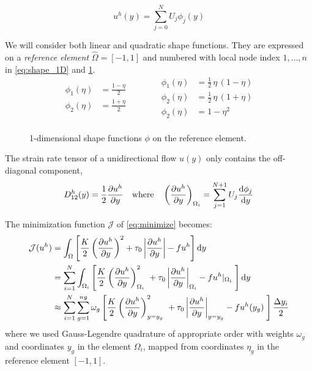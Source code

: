 \documentclass[11 pt]{report}
\begin{document}
\begin{equation}
        u^h(y) = \sum_{j=0}^N U_j \phi_j(y)
\end{equation}

We will consider both linear and quadratic shape functions. They are expressed on a \textit{reference element} $\hat \Omega = [-1, 1]$ and numbered with local node index $1,\dots,n$ in \cref{eq:shape_1D} and \cref{fig:shape_fct_1D}.
\begin{equation}
    \begin{split}
        \phi_1(\eta) &= \frac{1-\eta}{2}\\
        \phi_2(\eta) &= \frac{1+\eta}{2}\\
    \end{split}
    \hspace{40pt}
    \begin{split}
        \phi_1(\eta) &= \frac{1}{2} \, \eta \, (1-\eta)\\
        \phi_2(\eta) &= \frac{1}{2} \, \eta \, (1+\eta)\\
        \phi_2(\eta) &= 1 - \eta^2\\
    \end{split}
    \label{eq:shape_1D}
\end{equation}

\begin{figure}[ht]
    \centering
    
    \caption{1-dimensional shape functions $\phi$ on the reference element.}
    \label{fig:shape_fct_1D}
\end{figure}


The strain rate tensor of a unidirectional flow $u(y)$ only contains the off-diagonal component,
\begin{equation}
    D_{12}^h(y) = \frac{1}{2} \pdv{u^h}{y} \quad \text{where} \quad \left(\pdv{u^h}{y}\right)_{\Omega_i} = \sum_{j=1}^{N+1} U_j \dv{\phi_j}{y}
\end{equation}

The minimization function $\mathcal{J}$ of \cref{eq:minimize} becomes:
\begin{equation}
\begin{aligned}
    \mathcal{J}(u^h) &= \int_{\Omega} \left[ \frac{K}{2} \left(\pdv{u^h}{y}\right)^2 + \tau_0 \left|\pdv{u^h}{y}\right| - f u^h \right] \dd y\\
    &= \sum_{i=1}^N \int_{\Omega_i} \left[\frac{K}{2}  \left(\pdv{u^h}{y}\right)^2_{\Omega_i} \ + \tau_0 \left|\pdv{u^h}{y}\right|_{\Omega_i} - f u^h\vert_{\Omega_i} \; \right] \dd y\\
    &\approx \sum_{i=1}^N \sum_{g=1}^{ng} \omega_{g} \left[\frac{K}{2}  \left(\pdv{u^h}{y}\right)^2_{y=y_g} \ + \tau_0 \left|\pdv{u^h}{y}\right|_{y=y_g} - f u^h(y_g) \; \right] \frac{\Delta y_i}{2}
\end{aligned}
\end{equation}
where we used Gauss-Legendre quadrature of appropriate order with weights $\omega_g$ and coordinates $y_g$ in the element $\Omega_i$, mapped from coordinates $\eta_g$ in the reference element $[-1,1]$.
\end{document}
